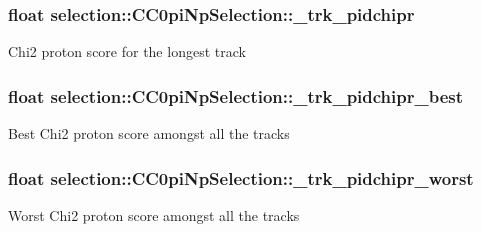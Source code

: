 \subsubsection[{\texorpdfstring{\+\_\+trk\+\_\+pidchipr}{_trk_pidchipr}}]{\setlength{\rightskip}{0pt plus 5cm}float selection\+::\+C\+C0pi\+Np\+Selection\+::\+\_\+trk\+\_\+pidchipr\hspace{0.3cm}{\ttfamily [private]}}\hypertarget{classselection_1_1CC0piNpSelection_a712eaf6dc6086f1be5705a3bbe5226fc}{}\label{classselection_1_1CC0piNpSelection_a712eaf6dc6086f1be5705a3bbe5226fc}
Chi2 proton score for the longest track 
\subsubsection[{\texorpdfstring{\+\_\+trk\+\_\+pidchipr\+\_\+best}{_trk_pidchipr_best}}]{\setlength{\rightskip}{0pt plus 5cm}float selection\+::\+C\+C0pi\+Np\+Selection\+::\+\_\+trk\+\_\+pidchipr\+\_\+best\hspace{0.3cm}{\ttfamily [private]}}\hypertarget{classselection_1_1CC0piNpSelection_aaf0a2841494bc52da55d267bc3c8db3d}{}\label{classselection_1_1CC0piNpSelection_aaf0a2841494bc52da55d267bc3c8db3d}
Best Chi2 proton score amongst all the tracks 
\subsubsection[{\texorpdfstring{\+\_\+trk\+\_\+pidchipr\+\_\+worst}{_trk_pidchipr_worst}}]{\setlength{\rightskip}{0pt plus 5cm}float selection\+::\+C\+C0pi\+Np\+Selection\+::\+\_\+trk\+\_\+pidchipr\+\_\+worst\hspace{0.3cm}{\ttfamily [private]}}\hypertarget{classselection_1_1CC0piNpSelection_a6c06ff43f89cbee19cf466b830a6fe38}{}\label{classselection_1_1CC0piNpSelection_a6c06ff43f89cbee19cf466b830a6fe38}
Worst Chi2 proton score amongst all the tracks 
